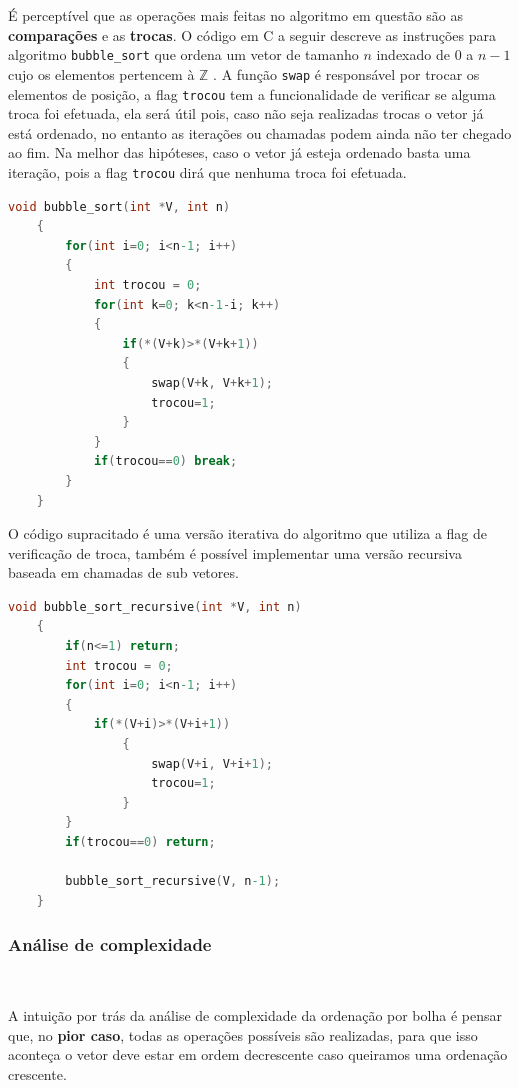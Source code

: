 É perceptível que as operações mais feitas no algoritmo em questão são as \textbf{comparações} e as \textbf{trocas}. O código em C a seguir descreve as instruções para algoritmo \texttt{bubble\_sort} que ordena um vetor de tamanho $n$ indexado de $0$ a $n-1$ cujo os elementos pertencem à $\mathbb{Z}$ . A função \texttt{swap} é responsável por trocar os elementos de posição, a flag \texttt{trocou} tem a funcionalidade de verificar se alguma troca foi efetuada, ela será útil pois, caso não seja realizadas trocas o vetor já está ordenado, no entanto as iterações ou chamadas podem ainda não ter chegado ao fim. Na melhor das hipóteses, caso o vetor já esteja ordenado basta uma iteração, pois a flag \texttt{trocou} dirá que nenhuma troca foi efetuada.

\begin{lstlisting}[language=C, frame=single]
    void bubble_sort(int *V, int n)
    {
        for(int i=0; i<n-1; i++)
        {
            int trocou = 0;
            for(int k=0; k<n-1-i; k++)
            {
                if(*(V+k)>*(V+k+1))
                {
                    swap(V+k, V+k+1);
                    trocou=1;
                }
            }
            if(trocou==0) break;
        }
    }
\end{lstlisting}

O código supracitado é uma versão iterativa do algoritmo que utiliza a flag de verificação de troca, também é possível implementar uma versão recursiva baseada em chamadas de sub vetores.

\begin{lstlisting}[language=C, frame=single]
    void bubble_sort_recursive(int *V, int n)
    {
        if(n<=1) return;
        int trocou = 0;
        for(int i=0; i<n-1; i++)
        {
            if(*(V+i)>*(V+i+1))
                {
                    swap(V+i, V+i+1);
                    trocou=1;
                }
        }
        if(trocou==0) return;

        bubble_sort_recursive(V, n-1);
    }
\end{lstlisting}

\subsubsection{Análise de complexidade}
\

A intuição por trás da análise de complexidade da ordenação por bolha é pensar que, no \textbf{pior caso}, todas as operações possíveis são realizadas, para que isso aconteça o vetor deve estar em ordem decrescente caso queiramos uma ordenação crescente.

